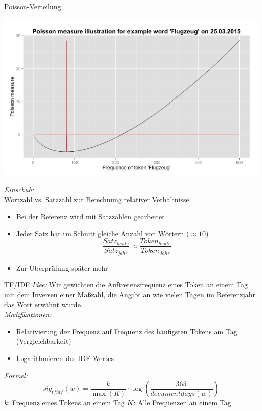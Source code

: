 \documentclass{beamer}
\begin{document}
\begin{frame}{Poisson-Verteilung}
	  \begin{centering}
	  \includegraphics[width=1\textwidth]{pictures/poissonMeasureFlugzeug.png}
	\end{centering}
\end{frame}

\begin{frame}{\emph{Einschub: }\\Wortzahl vs. Satzzahl zur Berechnung relativer Verh\"altnisse}
	\begin{itemize}
		\item{Bei der Referenz wird mit Satzzahlen gearbeitet}
		
		\item{Jeder Satz hat im Schnitt gleiche Anzahl von W\"ortern ($\approx 10$)\\
			\begin{equation}
				\frac{Satz_{heute}}{Satz_{jahr}} \approx \frac{Token_{heute}}{Token_{Jahr}}
			\end {equation}
			}
		\item{Zur \"Uberpr\"ufung sp\"ater mehr}
	\end{itemize}
\end{frame}


\begin{frame}{TF/IDF}
 	\emph{Idee: } Wir gewichten die Auftretensfrequenz eines Token an einem Tag mit dem Inversen einer Maßzahl, die Angibt an wie vielen Tagen im Referenzjahr das Wort erw\"ahnt wurde.\\
	\emph{Modifikationen: } 
	\begin{itemize}
		\item{Relativierung der Frequenz auf Frequenz des h\"aufigsten Tokens am Tag (Vergleichbarkeit)}
		\item{Logarithmieren des IDF-Wertes}
	\end{itemize}
	\emph{Formel:}
	 \begin{equation}
		sig_{tf idf}(w) = \frac{k}{\max(K)} \cdot \log ( \frac{365}{documentdays(w)})
	\end{equation}
	$k$: Frequenz eines Tokens an einem Tag
	$K$: Alle Frequenzen an einem Tag
\end{frame}
\end{document}
